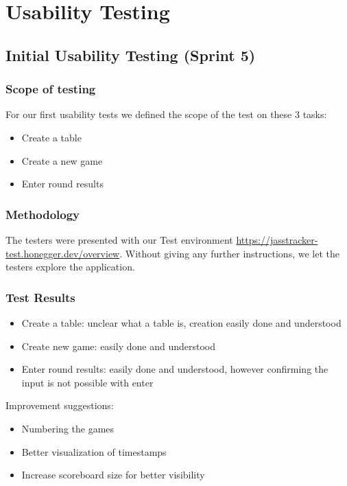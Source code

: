 \chapter{Usability Testing}\label{sec:uxTesting}

\section{Initial Usability Testing (Sprint 5)}

\subsection{Scope of testing}
For our first usability tests we defined the scope of the test on these 3 tasks:
\begin{itemize}
    \item Create a table
    \item Create a new game
    \item Enter round results
\end{itemize}

\subsection{Methodology}
The testers were presented with our Test environment \url{https://jasstracker-test.honegger.dev/overview}.
Without giving any further instructions, we let the testers explore the application. 

\subsection{Test Results}
\begin{itemize}
    \item Create a table: unclear what a table is, creation easily done and understood
    \item Create new game: easily done and understood
    \item Enter round results: easily done and understood, however confirming the input is not possible with enter
\end{itemize}
Improvement suggestions: 
\begin{itemize}
    \item Numbering the games 
    \item Better visualization of timestamps
    \item Increase scoreboard size for better visibility
\end{itemize}
